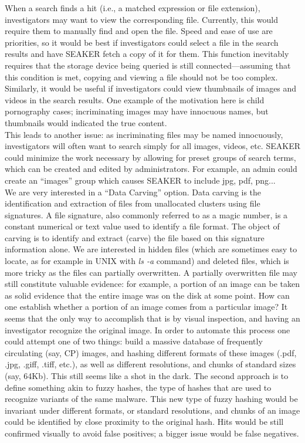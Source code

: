 \documentclass[12pt]{article}
\begin{document}
When a search finds a hit (i.e., a matched expression or file extension), investigators may want to
view the corresponding file. Currently, this would require them to manually find and open the file. Speed
and ease of use are priorities, so it would be best if investigators could select a file in the search results
and have SEAKER fetch a copy of it for them. This function inevitably requires that the storage device
being queried is still connected—assuming that this condition is met, copying and viewing a file should
not be too complex.\\

Similarly, it would be useful if investigators could view thumbnails of images and videos in the search
results. One example of the motivation here is child pornography cases; incriminating images may have
innocuous names, but thumbnails would indicated the true content.\\

This leads to another issue: as incriminating files may be named innocuously, investigators will often
want to search simply for all images, videos, etc. SEAKER could minimize the work necessary by
allowing for preset groups of search terms, which can be created and edited by administrators. For
example, an admin could create an “images” group which causes SEAKER to include jpg, pdf, png...\\

We are very interested in a “Data Carving” option. Data carving is the identification and extraction
of files from unallocated clusters using file signatures. A file signature, also commonly referred to as a
magic number, is a constant numerical or text value used to identify a file format. The object of carving
is to identify and extract (carve) the file based on this signature information alone. We are interested in
hidden files (which are sometimes easy to locate, as for example in UNIX with {\em ls -a} command) and
deleted files, which is more tricky as the files can partially overwritten. A partially overwritten file may
still constitute valuable evidence: for example, a portion of an image can be taken as solid evidence that
the entire image was on the disk at some point. How can one establish whether a portion of an image
comes from a particular image? It seems that the only way to accomplish that is by visual inspection,
and having an investigator recognize the original image. In order to automate this process one could
attempt one of two things: build a massive database of frequently circulating (say, CP) images, and
hashing different formats of these images (.pdf, .jpg, .giff, .tiff, etc.), as well as different resolutions,
and chunks of standard sizes (say, 64Kb). This still seems like a shot in the dark. The second approach
is to define something akin to fuzzy hashes, the type of hashes that are used to recognize variants of the
same malware. This new type of fuzzy hashing would be invariant under different formats, or standard
resolutions, and chunks of an image could be identified by close proximity to the original hash. Hits
would be still confirmed visually to avoid false positives; a bigger issue would be false negatives.\\
\end{document}
